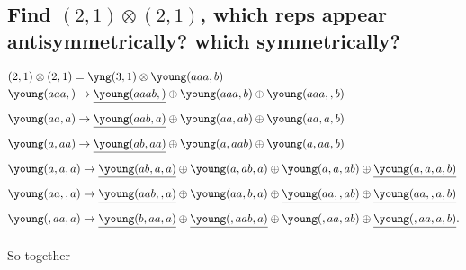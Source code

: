 \documentclass[main.tex]{subfiles}
\begin{document}
\subsection{Find $(2,1)\otimes(2,1)$, which reps appear antisymmetrically? which symmetrically?}

\begin{align*}
&(2,1)\otimes(2,1)=\yng(3,1)\otimes\young(aaa,b)\\
&\young(\hfil\hfil\hfil aaa,\hfil) \rightarrow  \sout{\young(\hfil\hfil\hfil aaab,\hfil)}\oplus \young(\hfil\hfil\hfil aaa,\hfil b)\oplus\young(\hfil\hfil\hfil aaa,\hfil,b)\nonumber\\
&\young(\hfil\hfil\hfil aa,\hfil a)\rightarrow \sout{\young(\hfil\hfil\hfil aab,\hfil a)} \oplus \young(\hfil\hfil\hfil aa,\hfil ab) \oplus \young(\hfil\hfil\hfil aa,\hfil a,b)\nonumber\\
&\young(\hfil\hfil\hfil a,\hfil aa)\rightarrow\sout{\young(\hfil\hfil\hfil ab,\hfil aa)}\oplus\young(\hfil\hfil\hfil a,\hfil aab)\oplus\young(\hfil\hfil\hfil a,\hfil aa,b)\nonumber\\
&\young(\hfil\hfil\hfil a,\hfil a,a)\rightarrow\sout{\young(\hfil\hfil\hfil ab,\hfil a,a)}\oplus\young(\hfil\hfil\hfil a,\hfil ab,a)\oplus\young(\hfil\hfil\hfil a,\hfil a,ab)\oplus\sout{\young(\hfil\hfil\hfil a,\hfil a,a,b)}\nonumber\\
&\young(\hfil\hfil\hfil aa,\hfil ,a)\rightarrow\sout{\young(\hfil\hfil\hfil aab,\hfil ,a)}\oplus\young(\hfil\hfil\hfil aa,\hfil b,a)\oplus\sout{\young(\hfil\hfil\hfil aa,\hfil ,ab)}\oplus\sout{\young(\hfil\hfil\hfil aa,\hfil ,a,b)}\nonumber\\
&\young(\hfil\hfil\hfil ,\hfil aa,a)\rightarrow\sout{\young(\hfil\hfil\hfil b,\hfil aa,a)}\oplus\sout{\young(\hfil\hfil\hfil ,\hfil aab,a)}\oplus\young(\hfil\hfil\hfil ,\hfil aa,ab)\oplus\sout{\young(\hfil\hfil\hfil ,\hfil aa,a,b)}.
\end{align*}

So together
\end{document}
